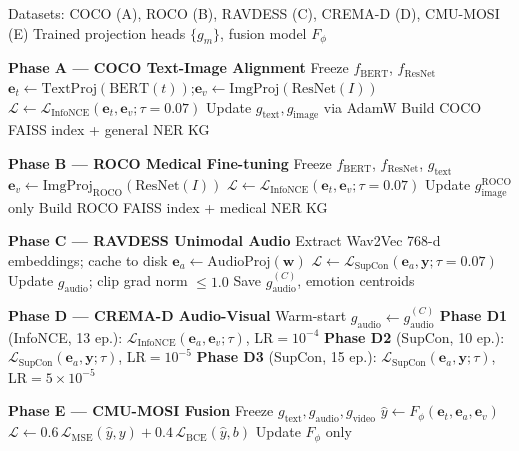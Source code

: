 \documentclass[10pt,conference]{IEEEtran}
\theoremstyle{ieeethm}
\theoremstyle{ieeedef}
\theoremstyle{ieeeremark}
\begin{document}
\begin{algorithm}[!t]
\caption{MIVA-KNIGHT Multi-Pipeline Training}
\label{alg:training}
\begin{algorithmic}[1]
\Require Datasets: COCO (A), ROCO (B), RAVDESS (C), CREMA-D (D), CMU-MOSI (E)
\Ensure Trained projection heads $\{g_m\}$, fusion model $F_\phi$

\Statex \textbf{Phase A — COCO Text-Image Alignment}
\State Freeze $f_\text{BERT}$, $f_\text{ResNet}$
    \State $\mathbf{e}_t \gets \text{TextProj}(\text{BERT}(t))$;\quad $\mathbf{e}_v \gets \text{ImgProj}(\text{ResNet}(I))$
    \State $\mathcal{L} \gets \mathcal{L}_\text{InfoNCE}(\mathbf{e}_t, \mathbf{e}_v; \tau{=}0.07)$
    \State Update $g_\text{text}, g_\text{image}$ via AdamW
  \EndFor
\EndFor
\State Build COCO FAISS index + general NER KG

\Statex \textbf{Phase B — ROCO Medical Fine-tuning}
\State Freeze $f_\text{BERT}$, $f_\text{ResNet}$, $g_\text{text}$
    \State $\mathbf{e}_v \gets \text{ImgProj}_\text{ROCO}(\text{ResNet}(I))$
    \State $\mathcal{L} \gets \mathcal{L}_\text{InfoNCE}(\mathbf{e}_t, \mathbf{e}_v; \tau{=}0.07)$
    \State Update $g_\text{image}^\text{ROCO}$ only
  \EndFor
\EndFor
\State Build ROCO FAISS index + medical NER KG

\Statex \textbf{Phase C — RAVDESS Unimodal Audio}
\State Extract Wav2Vec 768-d embeddings; cache to disk
    \State $\mathbf{e}_a \gets \text{AudioProj}(\mathbf{w})$
    \State $\mathcal{L} \gets \mathcal{L}_\text{SupCon}(\mathbf{e}_a, \mathbf{y}; \tau{=}0.07)$
    \State Update $g_\text{audio}$; clip grad norm $\leq 1.0$
  \EndFor
\EndFor
\State Save $g_\text{audio}^{(C)}$, emotion centroids

\Statex \textbf{Phase D — CREMA-D Audio-Visual}
\State Warm-start $g_\text{audio} \leftarrow g_\text{audio}^{(C)}$
\State \textbf{Phase D1} (InfoNCE, 13 ep.): $\mathcal{L}_\text{InfoNCE}(\mathbf{e}_a, \mathbf{e}_v; \tau)$, LR$=10^{-4}$
\State \textbf{Phase D2} (SupCon, 10 ep.): $\mathcal{L}_\text{SupCon}(\mathbf{e}_a, \mathbf{y}; \tau)$, LR$=10^{-5}$
\State \textbf{Phase D3} (SupCon, 15 ep.): $\mathcal{L}_\text{SupCon}(\mathbf{e}_a, \mathbf{y}; \tau)$, LR$=5{\times}10^{-5}$

\Statex \textbf{Phase E — CMU-MOSI Fusion}
\State Freeze $g_\text{text}, g_\text{audio}, g_\text{video}$
    \State $\hat{y} \gets F_\phi(\mathbf{e}_t, \mathbf{e}_a, \mathbf{e}_v)$
    \State $\mathcal{L} \gets 0.6\,\mathcal{L}_\text{MSE}(\hat{y},y) + 0.4\,\mathcal{L}_\text{BCE}(\hat{y},b)$
    \State Update $F_\phi$ only
  \EndFor
\EndFor
\end{algorithmic}
\end{algorithm}
\end{document}
